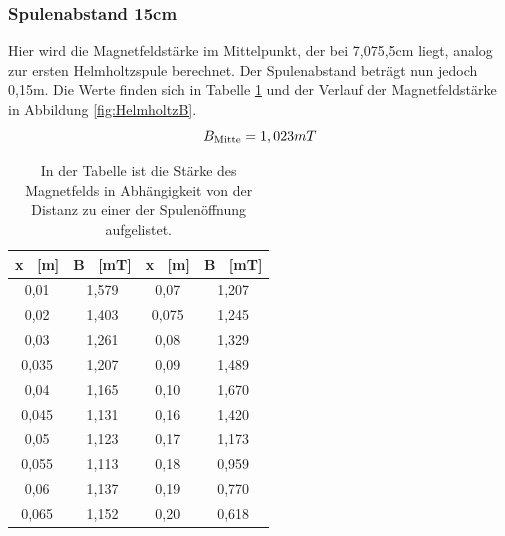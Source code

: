 \documentclass[titlepage = firstcover]{scrartcl}
\begin{document}
            \subsubsection{Spulenabstand 15cm}
            Hier wird die Magnetfeldstärke im Mittelpunkt, der bei 7,075,5cm liegt, analog zur ersten Helmholtzspule berechnet. Der Spulenabstand beträgt nun 
            jedoch 0,15m. Die Werte finden sich in Tabelle \ref{tab:HelmholtzB} und der Verlauf der Magnetfeldstärke in Abbildung \ref{fig:HelmholtzB}.
            \begin{equation}
                B_{\text{Mitte}} = 1,023mT \\
                \label{eqn:HelmB}
            \end{equation}
            \begin{table}[h]
                \centering 
                \caption{In der Tabelle ist die Stärke des Magnetfelds in Abhängigkeit von der Distanz zu einer der Spulenöffnung aufgelistet.}
                \label{tab:HelmholtzB}

                \begin{tabular}{c c c c}
                    \toprule
                    {x \ [m]} & {B \ [mT]} & {x \ [m]} & {B \ [mT]} \\
                    \midrule
                    0,01  & 1,579 & 0,07 & 1,207 \\
                    0,02  & 1,403 & 0,075 & 1,245 \\
                    0,03  & 1,261 & 0,08 & 1,329 \\
                    0,035 & 1,207 & 0,09 & 1,489 \\
                    0,04  & 1,165 & 0,10 & 1,670 \\
                    0,045 & 1,131 & 0,16 & 1,420 \\
                    0,05  & 1,123 & 0,17 & 1,173 \\
                    0,055 & 1,113 & 0,18 & 0,959 \\
                    0,06  & 1,137 & 0,19 & 0,770 \\
                    0,065 & 1,152 & 0,20 & 0,618 \\
                    \bottomrule
                \end{tabular}                
            \end{table}
\end{document}
